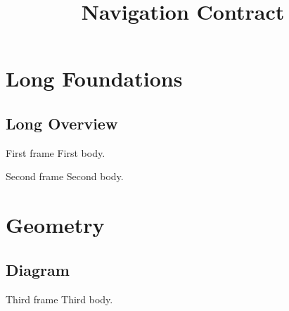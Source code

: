 \documentclass[aspectratio=169]{beamer}
\title{Navigation Contract}
\author{}
\institute{}
\date{}
\begin{document}
\section[Foundations]{Long Foundations}
\subsection[Overview]{Long Overview}

\begin{frame}{First frame}
  First body.
\end{frame}

\begin{frame}{Second frame}
  Second body.
\end{frame}

\section{Geometry}
\subsection{Diagram}

\begin{frame}{Third frame}
  Third body.
\end{frame}
\end{document}

